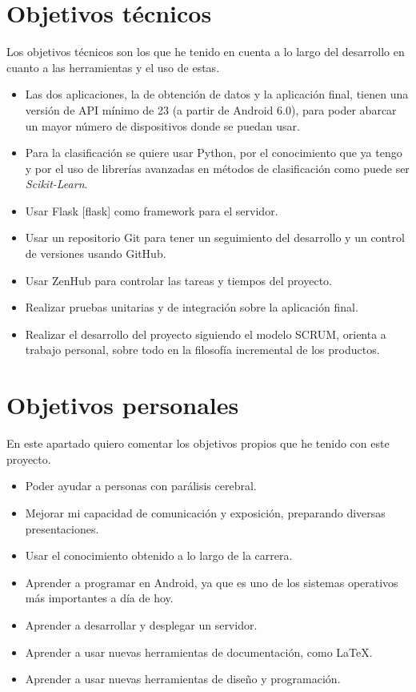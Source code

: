 \section{Objetivos técnicos}
Los objetivos técnicos son los que he tenido en cuenta a lo largo del desarrollo en cuanto a las herramientas y el uso de estas.
\begin{itemize}
	\item
	Las dos aplicaciones, la de obtención de datos y la aplicación final, tienen una versión de API mínimo de 23 (a partir de Android 6.0), para poder abarcar un mayor número de dispositivos donde se puedan usar.
	\item 
	Para la clasificación se quiere usar Python, por el conocimiento que ya tengo y por el uso de librerías avanzadas en métodos de clasificación como puede ser \textit{Scikit-Learn}.
	\item
	Usar Flask [flask] como framework para el servidor.
	\item 
	Usar un repositorio Git para tener un seguimiento del desarrollo y un control de versiones usando GitHub.
	\item 
	Usar ZenHub para controlar las tareas y tiempos del proyecto.
	\item
	Realizar pruebas unitarias y de integración sobre la aplicación final.
	\item
	Realizar el desarrollo del proyecto siguiendo el modelo SCRUM, orienta a trabajo personal, sobre todo en la filosofía incremental de los productos.
\end{itemize}

\section{Objetivos personales}
En este apartado quiero comentar los objetivos propios que he tenido con este proyecto.
\begin{itemize}
	\item
	Poder ayudar a personas con parálisis cerebral.
	\item 
	Mejorar mi capacidad de comunicación y exposición, preparando diversas presentaciones.
	\item
	Usar el conocimiento obtenido a lo largo de la carrera.
	\item 
	Aprender a programar en Android, ya que es uno de los sistemas operativos más importantes a día de hoy.
	\item 
	Aprender a desarrollar y desplegar un servidor.
	\item 
	Aprender a usar nuevas herramientas de documentación, como \LaTeX.
	\item 
	Aprender a usar nuevas herramientas de diseño y programación.
\end{itemize}